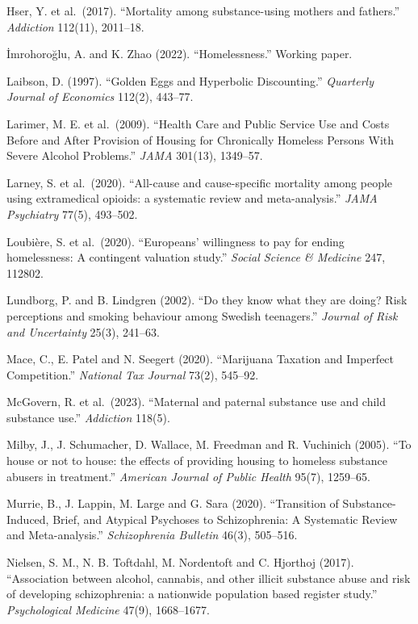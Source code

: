 \documentclass[10pt]{article}
\begin{document}
{\begin{list}{}{\setlength{\leftmargin}{1.5em}\setlength{\itemindent}{-1.5em}\setlength{\itemsep}{0.35em}\setlength{\parsep}{0em}}
\item Hser, Y. et al.\ (2017). ``Mortality among substance-using mothers and fathers.'' \emph{Addiction} 112(11), 2011--18.
\item \.{I}mrohoro\u{g}lu, A. and K. Zhao (2022). ``Homelessness.'' Working paper.
\item Laibson, D. (1997). ``Golden Eggs and Hyperbolic Discounting.'' \emph{Quarterly Journal of Economics} 112(2), 443--77.
\item Larimer, M. E. et al.\ (2009). ``Health Care and Public Service Use and Costs Before and After Provision of Housing for Chronically Homeless Persons With Severe Alcohol Problems.'' \emph{JAMA} 301(13), 1349--57.
\item Larney, S. et al.\ (2020). ``All-cause and cause-specific mortality among people using extramedical opioids: a systematic review and meta-analysis.'' \emph{JAMA Psychiatry} 77(5), 493--502.
\item Loubi\`ere, S. et al.\ (2020). ``Europeans' willingness to pay for ending homelessness: A contingent valuation study.'' \emph{Social Science \& Medicine} 247, 112802.
\item Lundborg, P. and B. Lindgren (2002). ``Do they know what they are doing? Risk perceptions and smoking behaviour among Swedish teenagers.'' \emph{Journal of Risk and Uncertainty} 25(3), 241--63.
\item Mace, C., E. Patel and N. Seegert (2020). ``Marijuana Taxation and Imperfect Competition.'' \emph{National Tax Journal} 73(2), 545--92.
\item McGovern, R. et al.\ (2023). ``Maternal and paternal substance use and child substance use.'' \emph{Addiction} 118(5).
\item Milby, J., J. Schumacher, D. Wallace, M. Freedman and R. Vuchinich (2005). ``To house or not to house: the effects of providing housing to homeless substance abusers in treatment.'' \emph{American Journal of Public Health} 95(7), 1259--65.
\item Murrie, B., J. Lappin, M. Large and G. Sara (2020). ``Transition of Substance-Induced, Brief, and Atypical Psychoses to Schizophrenia: A Systematic Review and Meta-analysis.'' \emph{Schizophrenia Bulletin} 46(3), 505--516.
\item Nielsen, S. M., N. B. Toftdahl, M. Nordentoft and C. Hjorthoj (2017). ``Association between alcohol, cannabis, and other illicit substance abuse and risk of developing schizophrenia: a nationwide population based register study.'' \emph{Psychological Medicine} 47(9), 1668--1677.

\end{list}}
\end{document}
